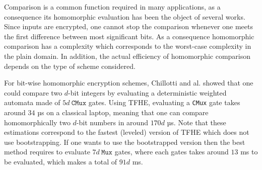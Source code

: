 Comparison is a common function required in many applications, as a consequence its homomorphic evaluation has been the object of several works.
Since inputs are encrypted, one cannot stop the comparison whenever one meets the first difference between most significant bits. As a consequence homomorphic comparison has a complexity which corresponds to the worst-case complexity in the plain domain. In addition, the actual efficiency of homomorphic comparison depends on the type of scheme considered.

For bit-wise homomorphic encryption schemes, Chillotti and al. showed that one could compare two $d$-bit integers by evaluating a deterministic weighted automata made of $5d~\texttt{CMux}$ gates. Using TFHE, evaluating a \texttt{CMux} gate takes around $34$ µs on a classical laptop, meaning that one can compare homomorphically two $d$-bit numbers in around $170d$ µs. Note that these estimations correspond to the fastest (leveled) version of TFHE which does not use bootstrapping. If one wants to use the bootstrapped version then the best method requires to evaluate $7d~\texttt{Mux}$ gates, where each gates takes around $13$ ms to be evaluated, which makes a total of $91d$ ms.

